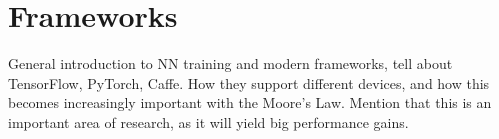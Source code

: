 \section{Frameworks}

General introduction to NN training and modern frameworks, tell about
TensorFlow, PyTorch, Caffe. How they support different devices, and how
this becomes increasingly important with the Moore's Law. Mention that this
is an important area of research, as it will yield big performance gains.
